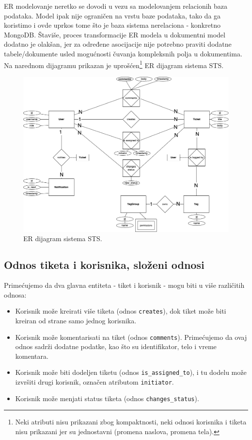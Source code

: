 \documentclass[12pt,oneside]{memoir}
\begin{document}
ER modelovanje neretko se dovodi u vezu sa modelovanjem relacionih baza podataka. Model ipak nije ograničen na vrstu baze podataka, tako da ga koristimo i ovde  uprkos tome što je baza sistema nerelaciona - konkretno MongoDB. Štaviše, proces transformacije ER modela u dokumentni model dodatno je olakšan, jer za određene asocijacije nije potrebno praviti dodatne tabele/dokumente usled mogućnosti čuvanja kompleksnih polja u dokumentima. Na narednom dijagramu prikazan je uprošćen\footnote{Neki atributi nisu prikazani zbog kompaktnosti, neki odnosi korisnika i tiketa nisu prikazani jer su jednostavni (promena naslova, promena tela).} ER dijagram sistema STS.

\begin{figure}[h]
  \centering
  \includegraphics[width=1\textwidth]{docs/images/ch_1/rdiagram.png} 
  \caption{ER dijagram sistema STS.}
\end{figure}

\newpage
\subsection{Odnos tiketa i korisnika, složeni odnosi}
Primećujemo da dva glavna entiteta - tiket i korisnik - mogu biti u više različitih odnosa:
\begin{itemize}
    \item Korisnik može kreirati više tiketa (odnos \verb|creates|), dok tiket može biti kreiran od strane samo jednog korisnika.
    \item Korisnik može komentarisati na tiket (odnos \verb|comments|). Primećujemo da ovaj odnos sadrži dodatne podatke, kao što su identifikator, telo i vreme komentara.
    \item Korisnik može biti dodeljen tiketu (odnos \verb|is_assigned_to|), i tu dodelu može izvršiti drugi korisnik, označen atributom \verb|initiator|.
    \item Korisnik može menjati status tiketa (odnos \verb|changes_status|).
\end{itemize}
\end{document}

